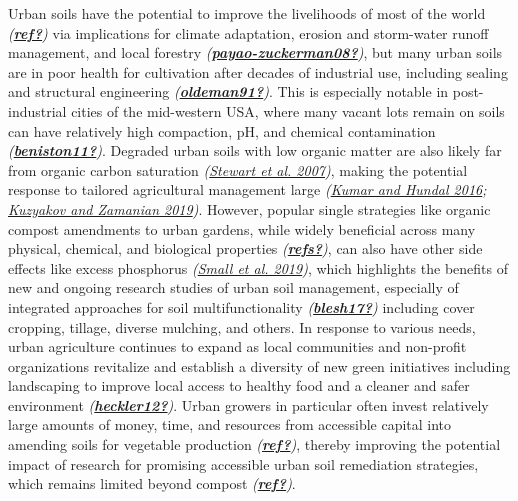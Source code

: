 \documentclass[
]{article}
\begin{document}
Urban soils have the potential to improve the livelihoods of most of the world \emph{(\protect\hyperlink{ref-ref}{\textbf{ref?}})} via implications for climate adaptation, erosion and storm-water runoff management, and local forestry \emph{(\protect\hyperlink{ref-payao-zuckerman08}{\textbf{payao-zuckerman08?}})}, but many urban soils are in poor health for cultivation after decades of industrial use, including sealing and structural engineering \emph{(\protect\hyperlink{ref-oldeman91}{\textbf{oldeman91?}})}.
This is especially notable in post-industrial cities of the mid-western USA, where many vacant lots remain on soils can have relatively high compaction, pH, and chemical contamination \emph{(\protect\hyperlink{ref-beniston11}{\textbf{beniston11?}})}.
Degraded urban soils with low organic matter are also likely far from organic carbon saturation \emph{(\protect\hyperlink{ref-stewart07}{Stewart et al. 2007})}, making the potential response to tailored agricultural management large \emph{(\protect\hyperlink{ref-kumar16}{Kumar and Hundal 2016}; \protect\hyperlink{ref-kuzyakov19}{Kuzyakov and Zamanian 2019})}.
However, popular single strategies like organic compost amendments to urban gardens, while widely beneficial across many physical, chemical, and biological properties \emph{(\protect\hyperlink{ref-refs}{\textbf{refs?}})}, can also have other side effects like excess phosphorus \emph{(\protect\hyperlink{ref-small19}{Small et al. 2019})}, which highlights the benefits of new and ongoing research studies of urban soil management, especially of integrated approaches for soil multifunctionality \emph{(\protect\hyperlink{ref-blesh17}{\textbf{blesh17?}})} including cover cropping, tillage, diverse mulching, and others.
In response to various needs, urban agriculture continues to expand as local communities and non-profit organizations revitalize and establish a diversity of new green initiatives including landscaping to improve local access to healthy food and a cleaner and safer environment \emph{(\protect\hyperlink{ref-heckler12}{\textbf{heckler12?}})}.
Urban growers in particular often invest relatively large amounts of money, time, and resources from accessible capital into amending soils for vegetable production \emph{(\protect\hyperlink{ref-ref}{\textbf{ref?}})},
thereby improving the potential impact of research for promising accessible urban soil remediation strategies, which remains limited beyond compost \emph{(\protect\hyperlink{ref-ref}{\textbf{ref?}})}.

\hfill\break
\end{document}
